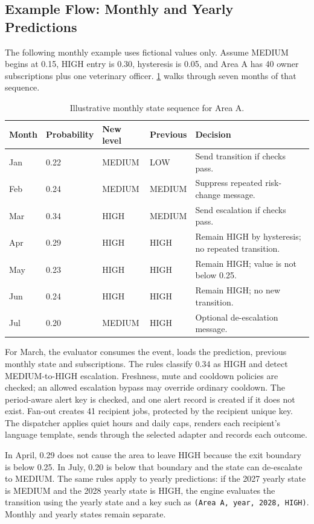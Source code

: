 \documentclass[10pt,openany]{report}
\begin{document}
\subsection{Example Flow: Monthly and Yearly Predictions}
The following monthly example uses fictional values only. Assume MEDIUM begins at 0.15, HIGH entry is 0.30, hysteresis is 0.05, and Area A has 40 owner subscriptions plus one veterinary officer. \cref{tab:monthly-example} walks through seven months of that sequence.
\begin{table}[htbp]\centering\small
\caption{Illustrative monthly state sequence for Area A.}\label{tab:monthly-example}
\begin{tabular}{p{1.4cm}p{1.7cm}p{1.7cm}p{1.8cm}p{6.0cm}}\toprule
\textbf{Month}&\textbf{Probability}&\textbf{New level}&\textbf{Previous}&\textbf{Decision}\\\midrule
Jan&0.22&MEDIUM&LOW&Send transition if checks pass.\\
Feb&0.24&MEDIUM&MEDIUM&Suppress repeated risk-change message.\\
Mar&0.34&HIGH&MEDIUM&Send escalation if checks pass.\\
Apr&0.29&HIGH&HIGH&Remain HIGH by hysteresis; no repeated transition.\\
May&0.23&HIGH&HIGH&Remain HIGH; value is not below 0.25.\\
Jun&0.24&HIGH&HIGH&Remain HIGH; no new transition.\\
Jul&0.20&MEDIUM&HIGH&Optional de-escalation message.\\\bottomrule
\end{tabular}\end{table}

For March, the evaluator consumes the event, loads the prediction, previous monthly state and subscriptions. The rules classify 0.34 as HIGH and detect MEDIUM-to-HIGH escalation. Freshness, mute and cooldown policies are checked; an allowed escalation bypass may override ordinary cooldown. The period-aware alert key is checked, and one alert record is created if it does not exist. Fan-out creates 41 recipient jobs, protected by the recipient unique key. The dispatcher applies quiet hours and daily caps, renders each recipient's language template, sends through the selected adapter and records each outcome.

In April, 0.29 does not cause the area to leave HIGH because the exit boundary is below 0.25. In July, 0.20 is below that boundary and the state can de-escalate to MEDIUM. The same rules apply to yearly predictions: if the 2027 yearly state is MEDIUM and the 2028 yearly state is HIGH, the engine evaluates the transition using the yearly state and a key such as \texttt{(Area A, year, 2028, HIGH)}. Monthly and yearly states remain separate.
\end{document}
